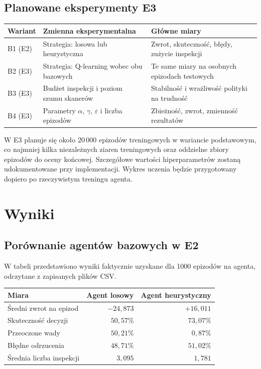 \documentclass[12pt]{article}
\begin{document}
\subsection{Planowane eksperymenty E3}

\begin{center}
\small
\renewcommand{\arraystretch}{1.2}
\begin{tabular}{p{}p{}p{}}
\toprule
Wariant & Zmienna eksperymentalna & Główne miary \\
\midrule
B1 (E2) & Strategia: losowa lub heurystyczna & Zwrot, skuteczność, błędy, zużycie inspekcji \\
B2 (E3) & Strategia: Q-learning wobec obu bazowych & Te same miary na osobnych epizodach testowych \\
B3 (E3) & Budżet inspekcji i poziom szumu skanerów & Stabilność i wrażliwość polityki na trudność \\
B4 (E3) & Parametry \(\alpha\), \(\gamma\), \(\varepsilon\) i liczba epizodów & Zbieżność, zwrot, zmienność rezultatów \\
\bottomrule
\end{tabular}
\end{center}

W E3 planuje się około 20\,000 epizodów treningowych w wariancie podstawowym, co najmniej kilka niezależnych ziaren treningowych oraz oddzielne zbiory epizodów do oceny końcowej. Szczegółowe wartości hiperparametrów zostaną udokumentowane przy implementacji. Wykres uczenia będzie przygotowany dopiero po rzeczywistym treningu agenta.

\section{Wyniki}

\subsection{Porównanie agentów bazowych w E2}

W tabeli przedstawiono wyniki faktycznie uzyskane dla 1000 epizodów na agenta, odczytane z zapisanych plików CSV.

\begin{center}
\small
\renewcommand{\arraystretch}{1.25}
\begin{tabular}{p{}rr}
\toprule
Miara & Agent losowy & Agent heurystyczny \\
\midrule
Średni zwrot na epizod & \(-24{,}873\) & \(+16{,}011\) \\
Skuteczność decyzji & \(50{,}57\%\) & \(73{,}07\%\) \\
Przeoczone wady & \(50{,}21\%\) & \(0{,}87\%\) \\
Błędne odrzucenia & \(48{,}71\%\) & \(51{,}02\%\) \\
Średnia liczba inspekcji & \(3{,}095\) & \(1{,}781\) \\
\bottomrule
\end{tabular}
\end{center}
\end{document}

